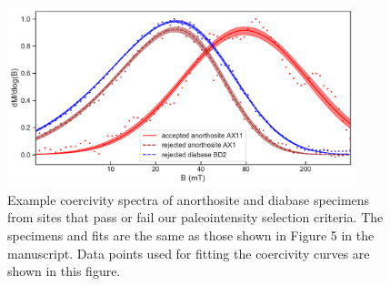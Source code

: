 \begin{figure}
\noindent\includegraphics[width=0.9\textwidth]{figure/Zhang2022/example_unmix_plot_with_data.pdf}
\centering
\caption[Example coercivity spectra of anorthosite and diabase specimens]{\footnotesize{Example coercivity spectra of anorthosite and diabase specimens from sites that pass or fail our paleointensity selection criteria. The specimens and fits are the same as those shown in Figure 5 in the manuscript. Data points used for fitting the coercivity curves are shown in this figure. }}
\label{fig:Cenozoic_PINT}
\end{figure}

\clearpage

